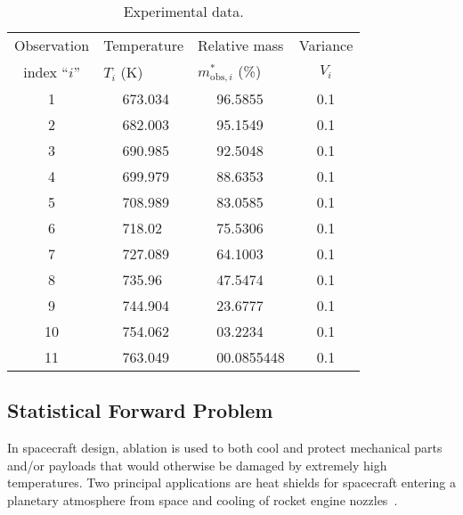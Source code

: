 \begin{table}[htb]
\begin{center}
\begin{tabular}{cllc}
\toprule
Observation   & Temperature     & Relative mass             & Variance \\
index ``$i$'' & $T_i$ (K)       & $m^*_{\text{obs},i}$ (\%) & $V_i$    \\
\midrule
\midrule
 1            & $\quad$ 673.034 & $\quad$ 96.5855    & 0.1      \\
 2            & $\quad$ 682.003 & $\quad$ 95.1549    & 0.1      \\
 3            & $\quad$ 690.985 & $\quad$ 92.5048    & 0.1      \\
 4            & $\quad$ 699.979 & $\quad$ 88.6353    & 0.1      \\
 5            & $\quad$ 708.989 & $\quad$ 83.0585    & 0.1      \\
 6            & $\quad$ 718.02  & $\quad$ 75.5306    & 0.1      \\
 7            & $\quad$ 727.089 & $\quad$ 64.1003    & 0.1      \\
 8            & $\quad$ 735.96  & $\quad$ 47.5474    & 0.1      \\
 9            & $\quad$ 744.904 & $\quad$ 23.6777    & 0.1      \\
 10           & $\quad$ 754.062 & $\quad$ 03.2234    & 0.1      \\
 11           & $\quad$ 763.049 & $\quad$ 00.0855448 & 0.1      \\
\bottomrule
\end{tabular}
\vspace{-.2cm}
\caption{Experimental data.}\label{table:data-tga}
\end{center}
\end{table}

\subsection{Statistical Forward Problem}\label{sec:tga-sfp}

In spacecraft design, ablation is used to both cool and protect mechanical parts and/or payloads that would otherwise be damaged by extremely high temperatures. Two principal applications are heat shields for spacecraft entering a planetary atmosphere from space and cooling of rocket engine nozzles~\cite{wiki:ablation}.

